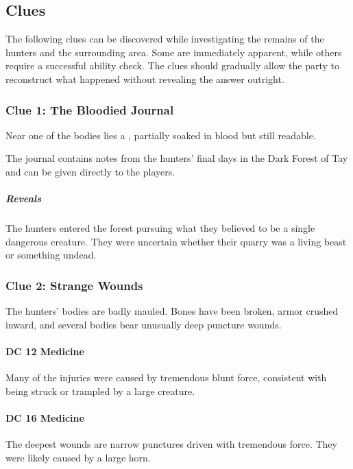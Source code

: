 \subsection*{Clues}
{\entryfont The following clues can be discovered while investigating the remains of the hunters and the surrounding area. Some are immediately apparent, while others require a successful ability check. The clues should gradually allow the party to reconstruct what happened without revealing the answer outright.}

\subsubsection*{Clue 1: The Bloodied Journal}
{\entryfont Near one of the bodies lies a \hyperref[resource:BloodiedHuntersJournal]{}, partially soaked in blood but still readable.

The journal contains notes from the hunters' final days in the Dark Forest of Tay and can be given directly to the players.

\subparagraph{Reveals} The hunters entered the forest pursuing what they believed to be a single dangerous creature. They were uncertain whether their quarry was a living beast or something undead.}

\subsubsection*{Clue 2: Strange Wounds}
{\entryfont The hunters' bodies are badly mauled. Bones have been broken, armor crushed inward, and several bodies bear unusually deep puncture wounds.

\paragraph{DC 12 Medicine} Many of the injuries were caused by tremendous blunt force, consistent with being struck or trampled by a large creature.

\paragraph{DC 16 Medicine} The deepest wounds are narrow punctures driven with tremendous force. They were likely caused by a large horn.}

